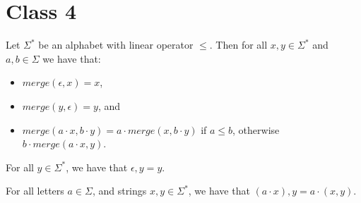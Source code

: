 \chapter{Class 4}

\begin{definition}[Merge] Let $\Sigma^*$ be an alphabet with linear operator $\leq$. Then for all $x,y \in \Sigma^*$ and $a,b \in \Sigma$ we have that:
    \begin{itemize}
        \item $merge(\epsilon, x) = x$,
        \item $merge(y, \epsilon) = y$, and
        \item $merge(a\cdot x, b\cdot y) = a\cdot merge(x, b\cdot y)$ if $a \leq b$, otherwise $b\cdot merge(a\cdot x, y)$.
    \end{itemize}
\end{definition}

\begin{definition}For all $y \in \Sigma^*$, we have that $\epsilon,y = y$.
    \label{def1}
\end{definition}

\begin{definition}For all letters $a \in \Sigma$, and strings $x,y \in \Sigma^*$, we have that $(a\cdot x), y = a \cdot (x,y)$.
    \label{def2}
\end{definition}


